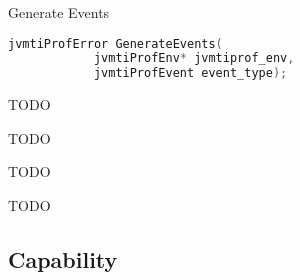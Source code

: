 \begin{apidef}{Generate Events}
\begin{lstlisting}[language=C]
jvmtiProfError GenerateEvents(
            jvmtiProfEnv* jvmtiprof_env,
            jvmtiProfEvent event_type);
\end{lstlisting}

\begin{apidesc}
TODO
\end{apidesc}

\begin{apiphase}
TODO
\end{apiphase}

\begin{apicap}
TODO
\end{apicap}

\begin{apiparam}
\end{apiparam}

\begin{apireturn}
TODO
\end{apireturn}

\begin{apierror}
\end{apierror}
\end{apidef}

\subsection{Capability}

